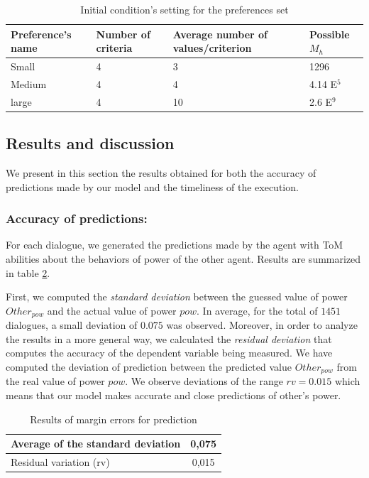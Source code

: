 \documentclass[sigconf]{aamas}  %
\begin{document}
	
		\begin{table}[]
			\caption{Initial condition's setting for the preferences set} 
			\centering
			\begin{tabular}{|p{1.75cm}|p{1.5cm}|p{1.75cm}|p{1.5cm}|}
				\hline 
				\textbf{Preference's name } & Number of criteria & Average number of values/criterion & Possible $M_h$\\
				\hline
					Small & 4 & 3 & 1296 \\
				\hline
					Medium & 4 & 4 & 4.14 E$^5$ \\
				\hline
				large & 4 & 10 & 2.6 E$^9$ \\
				\hline
			\end{tabular}

			\label{tab:initP}
		\end{table}
		
	\subsection{Results and discussion}
	We present in this section the results obtained for both the accuracy of predictions made by our model and the timeliness of the execution.
	
	\subsubsection{Accuracy of predictions:} For each dialogue, we generated the predictions made by the agent with ToM abilities about the behaviors of power of the other agent. Results are summarized in table \ref{tab:res1}. 
	
	
	First, we computed the \emph{standard deviation} between the guessed value of power $Other_{pow}$ and the actual value of power $pow$. In average, for the total of $1451$ dialogues, a small deviation of $0.075$ was observed. Moreover, in order to analyze the results in a more general way, we calculated the \emph{residual deviation }  that computes the accuracy of the dependent variable being measured. We have computed the deviation of prediction between the predicted value  $Other_{pow}$ from the real value of power $pow$. 
	We observe deviations of the range $rv = 0.015$ which means that our model makes accurate and close predictions of other's power.
	
	
	\begin{table}[h]
		\centering
		\caption{Results of margin errors for prediction} 
		\begin{tabular}{|l|c|}
			\hline
			Average of the standard deviation & 0,075 \\
			\hline
			Residual variation (rv) & 0,015 \\
			\hline
		\end{tabular}

		\label{tab:res1}
	\end{table}
	
\end{document}
